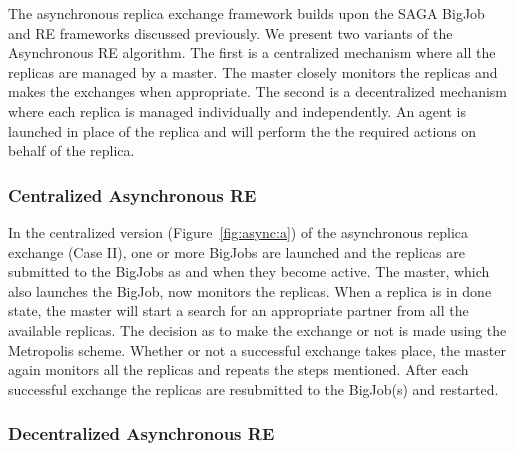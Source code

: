 \documentclass[a4paper,10pt]{article}
\newcommand{\alnote}[1]{ {\textcolor{blue} { ***andre: #1 }}}
\newcommand{\athotanote}[1]{ {\textcolor{green} { ***athota: #1 }}}
\newcommand{\alnote}[1]{}
\newcommand{\athotanote}[1]{}
\begin{document}
The asynchronous replica exchange framework builds upon the SAGA BigJob and RE frameworks discussed previously.
We present two variants of the Asynchronous RE algorithm. The first is a centralized 
mechanism where all the replicas are managed by a master. The master closely monitors the replicas and makes the exchanges when appropriate. 
The second is a decentralized mechanism where each replica is managed individually and independently. An agent is launched in place of the replica and will perform the the required actions on behalf of the replica.


\subsubsection{Centralized Asynchronous RE}



In the centralized version (Figure~\ref{fig:async:a}) of the
asynchronous replica exchange (Case II), one or more BigJobs are
launched and the replicas are submitted to the BigJobs as and when
they become active. The master, which also launches the BigJob, now
monitors the replicas. When a replica is in done state, the master
will start a search for an appropriate partner from all the available
replicas. The decision as to make the exchange or not is made using
the Metropolis scheme.  Whether or not a successful exchange takes
place, the master again monitors all the replicas and repeats the
steps mentioned.  After each successful exchange the replicas are
resubmitted to the BigJob(s) and restarted.

\subsubsection{Decentralized Asynchronous RE}
\end{document}
